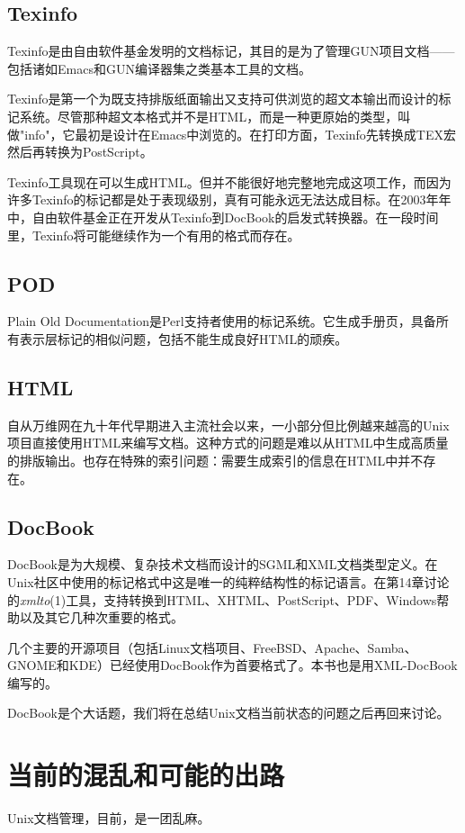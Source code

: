 \documentclass[12pt,oneside]{book}
\begin{document}
\subsection{Texinfo}
Texinfo是由自由软件基金发明的文档标记，其目的是为了管理GUN项目文档——包括诸如Emacs和GUN编译器集之类基本工具的文档。

Texinfo是第一个为既支持排版纸面输出又支持可供浏览的超文本输出而设计的标记系统。尽管那种超文本格式并不是HTML，而是一种更原始的类型，叫做"info"，它最初是设计在Emacs中浏览的。在打印方面，Texinfo先转换成TEX宏然后再转换为PostScript。

Texinfo工具现在可以生成HTML。但并不能很好地完整地完成这项工作，而因为许多Texinfo的标记都是处于表现级别，真有可能永远无法达成目标。在2003年年中，自由软件基金正在开发从Texinfo到DocBook的启发式转换器。在一段时间里，Texinfo将可能继续作为一个有用的格式而存在。

\subsection{POD}
Plain Old Documentation是Perl支持者使用的标记系统。它生成手册页，具备所有表示层标记的相似问题，包括不能生成良好HTML的顽疾。

\subsection{HTML}
自从万维网在九十年代早期进入主流社会以来，一小部分但比例越来越高的Unix项目直接使用HTML来编写文档。这种方式的问题是难以从HTML中生成高质量的排版输出。也存在特殊的索引问题：需要生成索引的信息在HTML中并不存在。

\subsection{DocBook}
DocBook是为大规模、复杂技术文档而设计的SGML和XML文档类型定义。在Unix社区中使用的标记格式中这是唯一的纯粹结构性的标记语言。在第14章讨论的\textit{xmlto}(1)工具，支持转换到HTML、XHTML、PostScript、PDF、Windows帮助以及其它几种次重要的格式。

几个主要的开源项目（包括Linux文档项目、FreeBSD、Apache、Samba、GNOME和KDE）已经使用DocBook作为首要格式了。本书也是用XML-DocBook编写的。

DocBook是个大话题，我们将在总结Unix文档当前状态的问题之后再回来讨论。

\section{当前的混乱和可能的出路}
Unix文档管理，目前，是一团乱麻。
\end{document}
